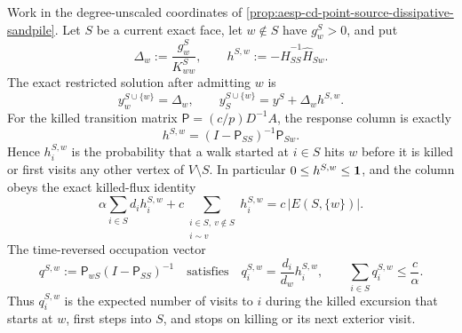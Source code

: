 \begin{proposition}
\label{prop:aesp-cd-point-source-hitting-column}
Work in the degree-unscaled coordinates of
\cref{prop:aesp-cd-point-source-dissipative-sandpile}.  Let \(S\) be a
current exact face, let \(w\notin S\) have \(g_w^S>0\), and put
\begin{equation*}
 \Delta_w:=\frac{g_w^S}{K^S_{ww}},
 \qquad
 h^{S,w}:=-\widehat H_{SS}^{-1}\widehat H_{Sw}.
\end{equation*}
The exact restricted solution after admitting \(w\) is
\begin{equation}
 y^{S\cup\{w\}}_w=\Delta_w,
 \qquad
 y^{S\cup\{w\}}_S=y^S+\Delta_w h^{S,w}.
 \label{eq:aesp-cd-point-source-hitting-update}
\end{equation}
For the killed transition matrix
\(\mathsf P=(c/p)D^{-1}A\), the response column is exactly
\begin{equation}
 h^{S,w}=(I-\mathsf P_{SS})^{-1}\mathsf P_{Sw}.
 \label{eq:aesp-cd-point-source-hitting-column}
\end{equation}
Hence \(h^{S,w}_i\) is the probability that a walk started at \(i\in S\)
hits \(w\) before it is killed or first visits any other vertex of
\(V\setminus S\).  In particular \(0\leq h^{S,w}\leq\mathbf{1}\), and the column
obeys the exact killed-flux identity
\begin{equation}
 \alpha\sum_{i\in S}d_i h^{S,w}_i
 +c\sum_{\substack{i\in S,\ v\notin S\\ i\sim v}}h^{S,w}_i
 =c\,|E(S,\{w\})|.
 \label{eq:aesp-cd-point-source-hitting-flux}
\end{equation}
The time-reversed occupation vector
\begin{equation}
 q^{S,w}:=\mathsf P_{wS}(I-\mathsf P_{SS})^{-1}
 \quad\text{satisfies}\quad
 q^{S,w}_i=\frac{d_i}{d_w}h^{S,w}_i,
 \qquad
 \sum_{i\in S}q^{S,w}_i\leq\frac c\alpha.
 \label{eq:aesp-cd-point-source-hitting-occupation}
\end{equation}
Thus \(q^{S,w}_i\) is the expected number of visits to \(i\) during the
killed excursion that starts at \(w\), first steps into \(S\), and stops on
killing or its next exterior visit.


\end{proposition}
